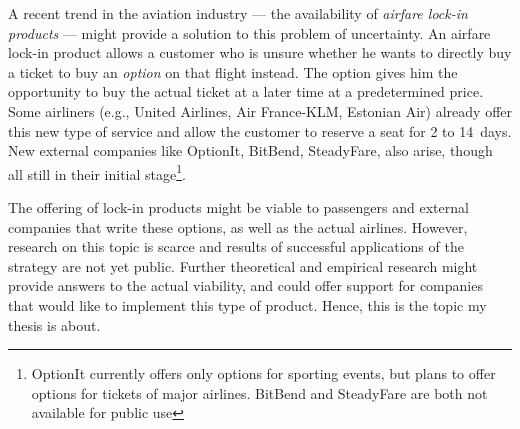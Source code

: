 A recent trend in the aviation industry --- the availability of \emph{airfare lock-in products} --- might provide a solution to this problem of uncertainty. An airfare lock-in product allows a customer who is unsure whether he wants to directly buy a ticket to buy an \emph{option} on that flight instead. The option gives him the opportunity to buy the actual ticket at a later time at a predetermined price. Some airliners (e.g., United Airlines, Air France-KLM, Estonian Air) already offer this new type of service and allow the customer to reserve a seat for 2 to 14~days. New external companies like OptionIt, BitBend, SteadyFare, also arise, though all still in their initial stage\footnote{OptionIt currently offers only options for sporting events, but plans to offer options for tickets of major airlines. BitBend and SteadyFare are both not available for public use}.

The offering of lock-in products might be viable to passengers and external companies that write these options, as well as the actual airlines. However, research on this topic is scarce and results of successful applications of the strategy are not yet public. Further theoretical and empirical research might provide answers to the actual viability, and could offer support for companies that would like to implement this type of product. Hence, this is the topic my thesis is about.
